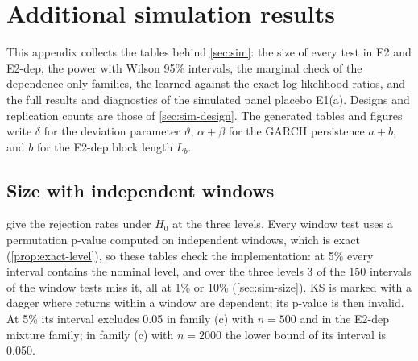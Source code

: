 \section{Additional simulation results}\label{app:sim}

This appendix collects the tables behind \cref{sec:sim}: the size of every test in E2 and E2-dep,
the power with Wilson 95\% intervals, the marginal check of the dependence-only families, the
learned against the exact log-likelihood ratios, and the full results and diagnostics of the
simulated panel placebo E1(a). Designs and replication counts are those of \cref{sec:sim-design}.
The generated tables and figures write $\delta$ for the deviation parameter $\vartheta$,
$\alpha+\beta$ for the GARCH persistence $a+b$, and $b$ for the E2-dep block length $L_b$.

\subsection{Size with independent windows}\label{app:sim-size}

 give the rejection rates under $H_0$ at the three levels. Every
window test uses a permutation p-value computed on independent windows, which is exact
(\cref{prop:exact-level}), so these tables check the implementation: at 5\% every interval contains
the nominal level, and over the three levels 3 of the 150 intervals of the window tests miss it,
all at 1\% or 10\% (\cref{sec:sim-size}). KS is marked with a dagger where returns within a window
are dependent; its p-value is then invalid. At 5\% its interval excludes 0.05 in family (c) with
$n=500$ and in the E2-dep mixture family; in family (c) with $n=2000$ the lower bound of its interval
is 0.050.

